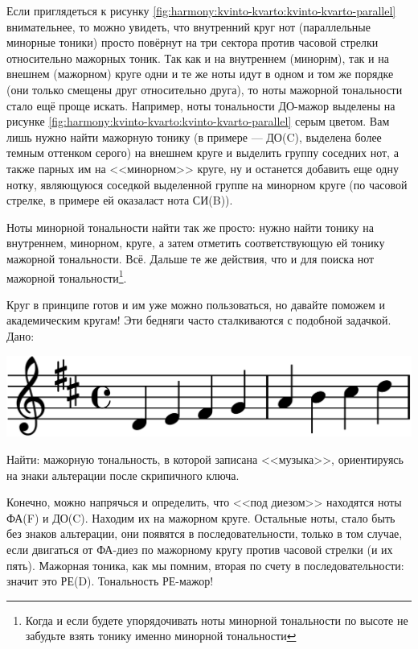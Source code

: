 Если приглядеться к рисунку \ref{fig:harmony:kvinto-kvarto:kvinto-kvarto-parallel} внимательнее, то можно увидеть, что внутренний круг нот (параллельные минорные тоники) просто повёрнут на три сектора против часовой стрелки относительно мажорных тоник. Так как и на внутреннем (минорнм), так и на внешнем (мажорном) круге одни и те же ноты идут в одном и том же порядке (они только смещены друг относительно друга), то ноты мажорной тональности стало ещё проще искать. Например, ноты тональности ДО-мажор выделены на рисунке \ref{fig:harmony:kvinto-kvarto:kvinto-kvarto-parallel} серым цветом. Вам лишь нужно найти мажорную тонику (в примере --- ДО(C), выделена более темным оттенком серого) на внешнем круге и выделить группу соседних нот, а также парных им на <<минорном>> круге, ну и останется добавить еще одну нотку, являющуюся соседкой выделенной группе на минорном круге (по часовой стрелке, в примере ей оказаласт нота СИ(B)).

Ноты минорной тональности найти так же просто: нужно найти тонику на внутреннем, минорном, круге, а затем отметить соответствующую ей тонику мажорной тональности. Всё. Дальше те же действия, что и для поиска нот мажорной тональности\footnote{Когда и если будете упорядочивать ноты минорной тональности по высоте не забудьте взять тонику именно минорной тональности}.

Круг в принципе готов и им уже можно пользоваться, но давайте поможем и академическим кругам! Эти бедняги часто сталкиваются с подобной задачкой. Дано:

\begin{center}    
    \includegraphics{fig/kvinto-kvarto/tonality-d-maj}
\end{center}

Найти: мажорную тональность, в которой записана <<музыка>>, ориентируясь на знаки альтерации после скрипичного ключа.

Конечно, можно напрячься и определить, что <<под диезом>> находятся ноты ФА(F) и ДО(C). Находим их на мажорном круге. Остальные ноты, стало быть без знаков альтерации, они появятся в последовательности, только в том случае, если двигаться от ФА-диез по мажорному кругу против часовой стрелки (и их пять). Мажорная тоника, как мы помним, вторая по счету в последовательности: значит это РЕ(D). Тональность РЕ-мажор!

